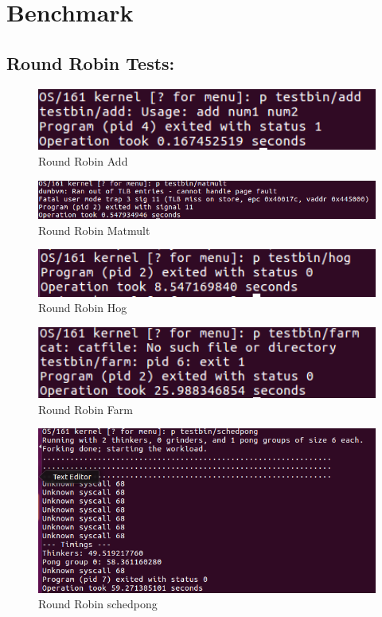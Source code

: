 \documentclass[12pt]{article}
\begin{document}
\section{Benchmark}
\subsection{Round Robin Tests: }
\begin{figure}[ht!]
	\centering
	\includegraphics[width=120mm]{roundrobinadd.png}
	\caption{Round Robin Add \label{RRA}}
\end{figure}
\begin{figure}[ht!]
	\centering
	\includegraphics[width=120mm]{roundrobinmatmult.png}
	\caption{Round Robin Matmult \label{RRA}}
\end{figure}
\begin{figure}[ht!]
	\centering
	\includegraphics[width=120mm]{roundrobinhog.png}
	\caption{Round Robin Hog \label{RRH}}
\end{figure}
\begin{figure}[ht!]
	\centering
	\includegraphics[width=120mm]{roundrobinfarm.png}
	\caption{Round Robin Farm \label{RRF}}
\end{figure}
\begin{figure}[ht!]
	\centering
	\includegraphics[width=120mm]{roundrobinschedpong.png}
	\caption{Round Robin schedpong \label{RRSP}}
\end{figure} 
\newpage
\end{document}
